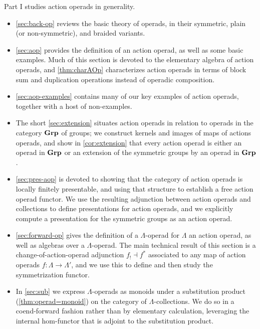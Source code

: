 Part I studies action operads in generality. 
\begin{itemize}
\item \cref{sec:back-op} reviews the basic theory of operads, in their symmetric, plain (or non-symmetric), and braided variants.
\item \cref{sec:aop} provides the definition of an action operad, as well as some basic examples. Much of this section is devoted to the elementary algebra of action operads, and \cref{thm:charAOp} characterizes action operads in terms of block sum and duplication operations instead of operadic composition. 
\item \cref{sec:aop-examples} contains many of our key examples of action operads, together with a host of non-examples. 
\item The short \cref{sec:extension} situates action operads in relation to operads in the category $\mathbf{Grp}$ of groups; we construct kernels and images of maps of actions operads, and show in \cref{cor:extension} that every action operad is either an operad in $\mathbf{Grp}$ or an extension of the symmetric groups by an operad in $\mathbf{Grp}$. 
\item \cref{sec:pres-aop} is devoted to showing that the category of action operads is locally finitely presentable, and using that structure to establish a free action operad functor. We use the resulting adjunction between action operads and collections to define presentations for action operads, and we explicitly compute a presentation for the symmetric groups as an action operad. 
\item \cref{sec:forward-op} gives the definition of a $\Lambda$-operad for $\Lambda$ an action operad, as well as algebras over a $\Lambda$-operad. The main technical result of this section is a change-of-action-operad adjunction $f_{!} \dashv f^*$ associated to any map of action operads $f \colon \Lambda \to \Lambda'$, and we use this to define and then study the symmetrization functor. 
\item In \cref{sec:sub} we express $\Lambda$-operads as monoids under a substitution product (\cref{thm:operad=monoid}) on the category of $\Lambda$-collections. We do so in a coend-forward fashion rather than by elementary calculation, leveraging the internal hom-functor that is adjoint to the substitution product.
\end{itemize}

